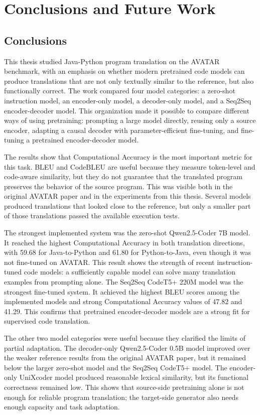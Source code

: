 \chapter{Conclusions and Future Work}

\section{Conclusions}

\quad This thesis studied Java-Python program translation on the AVATAR
benchmark, with an emphasis on whether modern pretrained code models can
produce translations that are not only textually similar to the reference, but
also functionally correct. The work compared four model categories: a
zero-shot instruction model, an encoder-only model, a decoder-only model, and a
Seq2Seq encoder-decoder model. This organization made it possible to compare
different ways of using pretraining: prompting a large model directly, reusing
only a source encoder, adapting a causal decoder with parameter-efficient
fine-tuning, and fine-tuning a pretrained encoder-decoder model.

The results show that Computational Accuracy is the most important metric for
this task. BLEU and CodeBLEU are useful because they measure token-level and
code-aware similarity, but they do not guarantee that the translated program
preserves the behavior of the source program. This was visible both in the
original AVATAR paper and in the experiments from this thesis. Several models
produced translations that looked close to the reference, but only a smaller
part of those translations passed the available execution tests.

The strongest implemented system was the zero-shot Qwen2.5-Coder 7B model. It
reached the highest Computational Accuracy in both translation directions,
with 59.68 for Java-to-Python and 61.80 for Python-to-Java, even though it was
not fine-tuned on AVATAR. This result shows the strength of recent
instruction-tuned code models: a sufficiently capable model can solve many
translation examples from prompting alone. The Seq2Seq CodeT5+ 220M model was
the strongest fine-tuned system. It achieved the highest BLEU scores among the
implemented models and strong Computational Accuracy values of 47.82 and
41.29. This confirms that pretrained encoder-decoder models are a strong fit
for supervised code translation.

The other two model categories were useful because they clarified the limits
of partial adaptation. The decoder-only Qwen2.5-Coder 0.5B model improved over
the weaker reference results from the original AVATAR paper, but it remained
below the larger zero-shot model and the Seq2Seq CodeT5+ model. The
encoder-only UniXcoder model produced reasonable lexical similarity, but its
functional correctness remained low. This shows that source-side pretraining
alone is not enough for reliable program translation; the target-side generator
also needs enough capacity and task adaptation.

